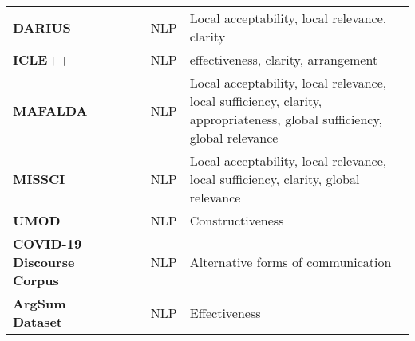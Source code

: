 {\begin{longtable}{P{4.1cm}P{1.9cm}P{3cm}P{1cm}p{4cm}}
\textbf{DARIUS} && \citet{schaller-etal-2024-darius} & NLP & Local acceptability, local relevance, clarity\\
\textbf{ICLE++} && \citet{li-ng-2024-icle} & NLP & effectiveness, clarity, arrangement\\
\textbf{MAFALDA} && \citet{helwe-etal-2024-mafalda} & NLP & Local acceptability, local relevance, local sufficiency, clarity, appropriateness, global sufficiency, global relevance\\
\textbf{MISSCI} && \citet{glockner-etal-2024-missci} & NLP & Local acceptability, local relevance, local sufficiency, clarity, global relevance\\
\textbf{UMOD} && \citet{falk-etal-2024-moderation} & NLP & Constructiveness\\
\textbf{COVID-19 Discourse Corpus} && \citet{falk-lapesa-2024-stories} & NLP & Alternative forms of communication\\
\textbf{ArgSum Dataset} && \citet{li-etal-2024-side} & NLP & Effectiveness\\
\end{longtable}}